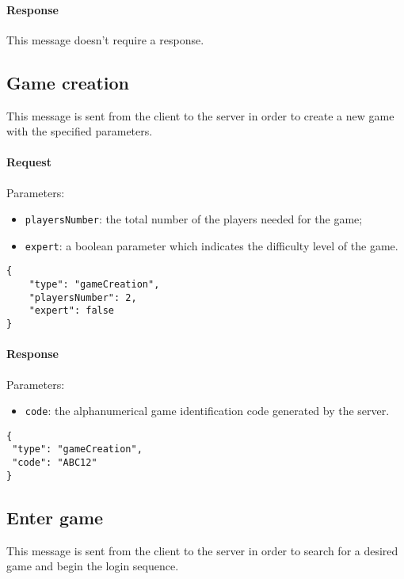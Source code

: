 \documentclass[a4paper]{article}
\begin{document}
	\paragraph{Response} This message doesn't require a response.

	\subsection{Game creation}

	This message is sent from the client to the server in order to create a new game with the specified parameters.

	\paragraph{Request} Parameters:

	\begin{itemize}
		\item \verb|playersNumber|: the total number of the players needed for the game;
		\item \verb|expert|: a boolean parameter which indicates the difficulty level of the game.
	\end{itemize}

	\begin{verbatim}
{
	"type": "gameCreation",
	"playersNumber": 2,
	"expert": false
}
	\end{verbatim}

	\paragraph{Response} Parameters:

	\begin{itemize}
		\item \verb|code|: the alphanumerical game identification code generated by the server.
	\end{itemize}

	\begin{verbatim}
{
 "type": "gameCreation",
 "code": "ABC12"
}
	\end{verbatim}

	\subsection{Enter game}

	This message is sent from the client to the server in order to search for a desired game and begin the login sequence.
\end{document}
